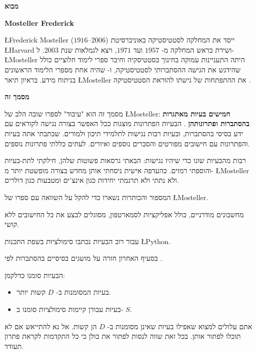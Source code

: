 \tableofcontents

\newpage

\begin{center}
\textbf{\Large מבוא}
\end{center}


\bigskip

\textbf{Mosteller Frederick}

\L{Frederick Mosteller}
($1916$--$2006$)
ייסד את המחלקה לסטטיסטיקה באוניברסיטת 
\L{Harvard}
ושירת כראש המחלקה מ-%
$1957$
ועד
$1971$,
ויצא לגמלאות שנת
$2003$.
ל-%
\L{Mosteller}
היתה התעניינות עמוקה בחינוך בסטטיסקיה וחיבר ספרי לימוד חלוציים כולל 
\cite{pwsa}
שהידגש את הגישה ההסתברותי לסטטיסטיקה, ו-%
\cite{bsda}
שהיה אחת מספרי הלימוד הראשונים בניתוח מידע. בראיון תיאר 
\L{Mosteller}
את ההתפתחות של גישתו להוראת הסטטיסטיקה
\cite{gse}.

\medskip

\textbf{מסמך זה}

מסמך זה הוא "עיבוד" לספרו שובה הלב של 
\L{Mosteller}: 
\textbf{חמישים בעיות מאתגרות בהסתברות ופתרונותהן}
\cite{fifty}.
הבעיות הפתרונות מוצגות ככל האפשר בצורה נגישה לקוראים עם ידע בסיסי בהסתברות, ובעיות רבות נגישות לתלמידי תיכון ולמורים. שכתבתי אתה בעיות והפתרונות עם חישובים מפורטים והסברים נוספים ואיורים. לעתים כללתי פתרונות נוספים.

רבות מהבעיות שונו כדי שיהיו נגישות: הבאתי גרסאות פשוטות שלהן, חילקתי לתת-בעיות והוספתי רמזים. כהעדפה אישית ניסחתי אותן מחדש בצורה מופשטת יותר מ-%
\L{Mosteller}
ולא נתתי ולא תרגמתי יחידות כגון אינצ'ים ומטבעות כגון דולרים.

המספור והכותרות נשארו כדי להקל על השוואה עם ספרו של
\L{Mosteller}.

מחשבונים מודרניים, כולל אפליקציות לסמארטפון, מסוגלים לבצע את כל החישובים ללא קושי.

עבור רוב הבעיות נכתבו סימולציות בשפת התכנות 
\L{Python}.

בסעיף האחרון חזרה על מושגים בסיסיים בהסתברות לפי
\cite{ross}.

הבעיות סומנו כדלקמן:
\begin{itemize}
\item 
בעיות המסומנות ב-%
$D$
קשות יותר.
\item
בעיות עבורן קיימות סימולציות סומנו ב-%
$S$.
\end{itemize}
אתם עלולים למצוא שאפילו בעיות שאינן מסומנות ב-%
$D$
הן קשות. אל נא להתייאש אם לא תוכלו לפתור אותן. בכל זאת שווה לנסות לפתור את כולן כי כל התקדמות לקראת פתרון תעודד.


